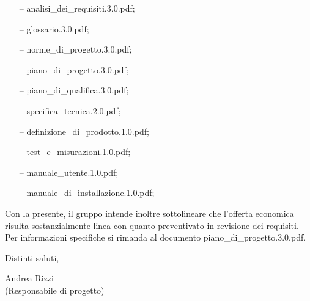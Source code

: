 \documentclass[a4paper,10pt]{letter}
\begin{document}
\begin{itemize}
\item[--] analisi\_dei\_requisiti.3.0.pdf;
\item[--] glossario.3.0.pdf;
\item[--] norme\_di\_progetto.3.0.pdf;
\item[--] piano\_di\_progetto.3.0.pdf;
\item[--] piano\_di\_qualifica.3.0.pdf;
\item[--] specifica\_tecnica.2.0.pdf;
\item[--] definizione\_di\_prodotto.1.0.pdf;
\item[--] test\_e\_misurazioni.1.0.pdf;
\item[--] manuale\_utente.1.0.pdf;
\item[--] manuale\_di\_installazione.1.0.pdf;
\end{itemize}
Con la presente, il gruppo intende inoltre sottolineare che l'offerta economica risulta sostanzialmente linea con quanto preventivato in revisione dei requisiti. Per informazioni specifiche si rimanda al documento piano\_di\_progetto.3.0.pdf.


Distinti saluti,\\

\begin{flushright}
\begin{minipage}[t]{.35\textwidth}
Andrea Rizzi\\
(Responsabile di progetto)
\end{minipage}
\end{flushright}
\end{document}
